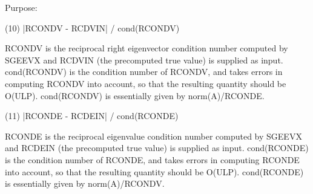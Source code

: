 \begin{DoxyParagraph}{Purpose\+: }
\begin{DoxyVerb}
   (10)  |RCONDV - RCDVIN| / cond(RCONDV)

      RCONDV is the reciprocal right eigenvector condition number
      computed by SGEEVX and RCDVIN (the precomputed true value)
      is supplied as input. cond(RCONDV) is the condition number of
      RCONDV, and takes errors in computing RCONDV into account, so
      that the resulting quantity should be O(ULP). cond(RCONDV) is
      essentially given by norm(A)/RCONDE.

   (11)  |RCONDE - RCDEIN| / cond(RCONDE)

      RCONDE is the reciprocal eigenvalue condition number
      computed by SGEEVX and RCDEIN (the precomputed true value)
      is supplied as input.  cond(RCONDE) is the condition number
      of RCONDE, and takes errors in computing RCONDE into account,
      so that the resulting quantity should be O(ULP). cond(RCONDE)
      is essentially given by norm(A)/RCONDV.\end{DoxyVerb}
 
\end{DoxyParagraph}

